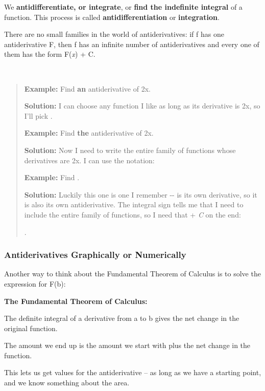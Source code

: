 We \textbf{antidifferentiate, or integrate}, or \textbf{find the
indefinite integral} of a function. This process is called
\textbf{antidifferentiation} or \textbf{integration}.

There are no small families in the world of antiderivatives: if f has
one antiderivative F, then f has an infinite number of antiderivatives
and every one of them has the form F(\emph{x}) + C.

\textbf{\\
}

\begin{quote}
\textbf{Example:} Find \textbf{an} antiderivative of 2x.

\textbf{Solution:} I can choose any function I like as long as its
derivative is 2x, so I'll pick .

\textbf{Example:} Find \textbf{the} antiderivative of 2x.

\textbf{Solution:} Now I need to write the entire family of functions
whose derivatives are 2x. I can use the notation:

\textbf{Example:} Find .

\textbf{Solution:} Luckily this one is one I remember -\/- is its own
derivative, so it is also its own antiderivative. The integral sign
tells me that I need to include the entire family of functions, so I
need that + \emph{C} on the end:

.
\end{quote}

\subsubsection{}\label{section-6}

\subsubsection{Antiderivatives Graphically or
Numerically}\label{antiderivatives-graphically-or-numerically}

Another way to think about the Fundamental Theorem of Calculus is to
solve the expression for F(b):

\textbf{The Fundamental Theorem of Calculus:}

The definite integral of a derivative from a to b gives the net change
in the original function.

The amount we end up is the amount we start with plus the net change in
the function.

This lets us get values for the antiderivative -- as long as we have a
starting point, and we know something about the area.

